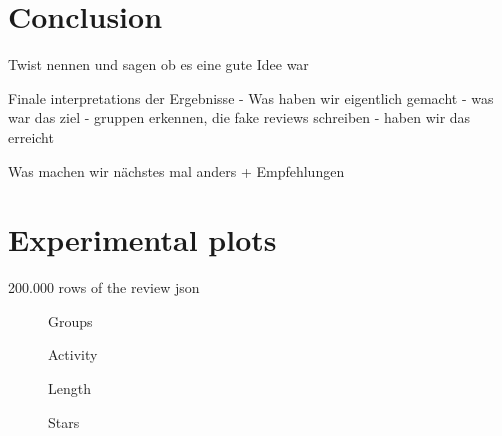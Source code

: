 \documentclass[conference]{IEEEtran}  %
\theoremstyle{plain}
\theoremstyle{definition}
\theoremstyle{remark}
\begin{document}
\section{Conclusion}
\label{sec:concl}


Twist nennen und sagen ob es eine gute Idee war

Finale interpretations der Ergebnisse 
 - Was haben wir eigentlich gemacht
 - was war das ziel
     - gruppen erkennen, die fake reviews schreiben
 - haben wir das erreicht


Was machen wir nächstes mal anders + Empfehlungen


\section{Experimental plots}
\label{sec:plots}

200.000 rows of the review json

\graphicspath{{plots/}}


\begin{figure}[H]
  \centering
  \hfill
  \caption{Groups}
\end{figure}


\begin{figure}[H]
  \centering
  \hfill
  \caption{Activity}
\end{figure}

\begin{figure}[H]
  \centering
  \hfill
  \caption{Length}
\end{figure}

\begin{figure}[H]
  \centering
  \hfill
  \caption{Stars}
\end{figure}





\end{document}
